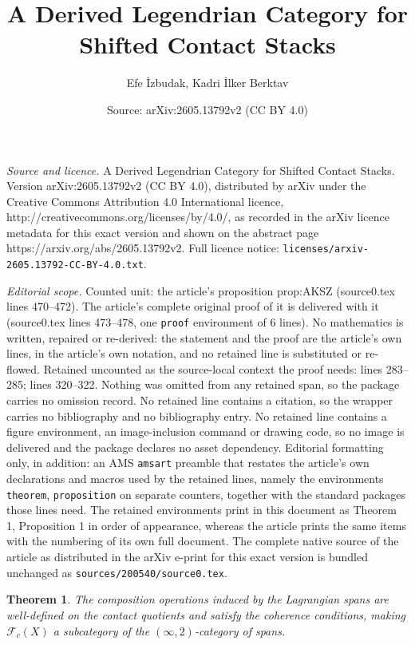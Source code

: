 \documentclass[10pt,a4paper]{amsart}
\title{A Derived Legendrian Category for Shifted Contact Stacks}
\author{Efe \.{I}zbudak, Kadri \.{I}lker Berktav}
\date{Source: arXiv:2605.13792v2 (CC BY 4.0)}
\newtheorem{theorem}{Theorem}
\begin{document}
\maketitle

\noindent\emph{Source and licence.} A Derived Legendrian Category for Shifted Contact Stacks. Version arXiv:2605.13792v2 (CC BY 4.0), distributed by arXiv under the Creative Commons Attribution 4.0 International licence, http://creativecommons.org/licenses/by/4.0/, as recorded in the arXiv licence metadata for this exact version and shown on the abstract page https://arxiv.org/abs/2605.13792v2. Full licence notice: \texttt{licenses/arxiv-2605.13792-CC-BY-4.0.txt}.\par\smallskip

\noindent\textit{Editorial scope.} Counted unit: the article's proposition prop:AKSZ (source0.tex lines 470--472). The article's complete original proof of it is delivered with it (source0.tex lines 473--478, one \texttt{proof} environment of 6 lines). No mathematics is written, repaired or re-derived: the statement and the proof are the article's own lines, in the article's own notation, and no retained line is substituted or re-flowed.  Retained uncounted as the source-local context the proof needs: lines 283--285; lines 320--322.  Nothing was omitted from any retained span, so the package carries no omission record.  No retained line contains a citation, so the wrapper carries no bibliography and no bibliography entry.  No retained line contains a figure environment, an image-inclusion command or drawing code, so no image is delivered and the package declares no asset dependency.  Editorial formatting only, in addition: an AMS \texttt{amsart} preamble that restates the article's own declarations and macros used by the retained lines, namely the environments \texttt{theorem}, \texttt{proposition} on separate counters, together with the standard packages those lines need.  The retained environments print in this document as Theorem 1, Proposition 1 in order of appearance, whereas the article prints the same items with the numbering of its own full document.  The complete native source of the article as distributed in the arXiv e-print for this exact version is bundled unchanged as \texttt{sources/200540/source0.tex}.
\begin{theorem}\label{thm:span}
The composition operations induced by the Lagrangian spans are well-defined on the contact quotients and satisfy the coherence conditions, making $\mathcal{F}_{c}(X)$ a subcategory of the $(\infty, 2)$-category of spans.
\end{theorem}
\end{document}
